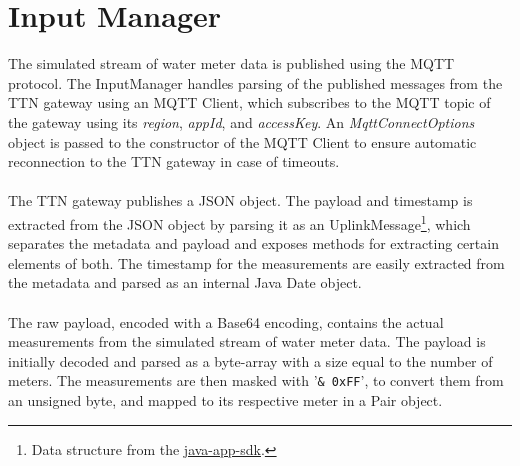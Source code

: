 





\section{Input Manager}
The simulated stream of water meter data is published using the MQTT protocol. The InputManager handles parsing of the published messages from the TTN gateway using an MQTT Client, which subscribes to the MQTT topic of the gateway using its \emph{region}, \emph{appId}, and \emph{accessKey}. An \emph{MqttConnectOptions} object is passed to the constructor of the MQTT Client to ensure automatic reconnection to the TTN gateway in case of timeouts.\\\\
The TTN gateway publishes a JSON object. The payload and timestamp is extracted from the JSON object by parsing it as an UplinkMessage\footnote{Data structure from the \href{https://github.com/TheThingsNetwork/java-app-sdk}{java-app-sdk}.}, which separates the metadata and payload and exposes methods for extracting certain elements of both. The timestamp for the measurements are easily extracted from the metadata and parsed as an internal Java Date object.\\\\
The raw payload, encoded with a Base64 encoding, contains the actual measurements from the simulated stream of water meter data. The payload is initially decoded and parsed as a byte-array with a size equal to the number of meters. The measurements are then masked with '\verb|& 0xFF|', to convert them from an unsigned byte, and mapped to its respective meter in a Pair object.





